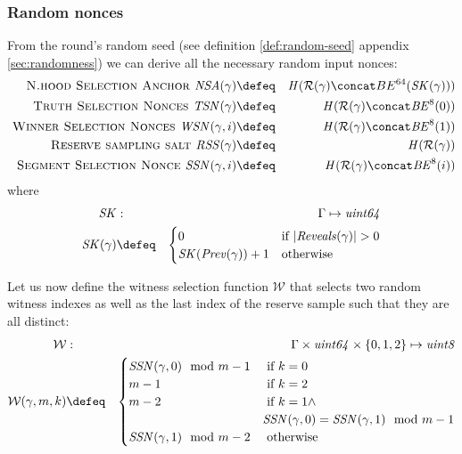 \subsubsection{Random nonces}

\begin{definition}
\label{def:nonce-round}

From the round's random seed (see definition \ref{def:random-seed} appendix \ref{sec:randomness}) we can derive all the necessary random input nonces:
%
\begin{eqnarray}
\textsc{ N.hood Selection Anchor   }\mathit{NSA}(\gamma)&\defeq&\mathit{H}(\mathcal{R}(\gamma)\concat BE^{64}(\mathit{SK}(\gamma)))\\
\textsc{ Truth Selection Nonces  }\mathit{TSN}(\gamma)&\defeq&\mathit{H}(\mathcal{R}(\gamma)\concat\mathit{BE}^{8}(0)) \\
\textsc{ Winner Selection Nonces  }\mathit{WSN}(\gamma, i)&\defeq&\mathit{H}(\mathcal{R}(\gamma)\concat\mathit{BE}^{8}(1)) \\
\textsc{ Reserve sampling salt } \mathit{RSS}(\gamma)&\defeq&\mathit{H}(\mathcal{R}(\gamma)) \\
\textsc{ Segment Selection Nonce } \mathit{SSN}(\gamma,i)&\defeq&\mathit{H}(\mathcal{R}(\gamma)\concat\mathit{BE}^{8}(i))
\end{eqnarray}
where 
\begin{eqnarray}
\mathit{SK}&:&\Gamma\mapsto\mathit{uint64}\\
\mathit{SK}(\gamma)&\defeq&\begin{cases}0&\text{if }\lvert\mathit{Reveals}(\gamma)\rvert>0\\
\mathit{SK}(\mathit{Prev}(\gamma))+1&\text{otherwise}
\end{cases}
\end{eqnarray}

Let us now define the witness selection function $\mathcal{W}$ that selects two random witness indexes as well as the last index of the reserve sample such that they are all distinct:
%
\begin{eqnarray}
\mathcal{W}&:&\Gamma\times\mathit{uint64}\times\{0,1,2\}\mapsto\mathit{uint8}\\
\mathcal{W}(\gamma,m,k)&\defeq&\begin{cases}
\mathit{SSN}(\gamma,0) \mod m-1&\text{ if }k=0\\
m-1&\text{ if }k=2\\
m-2&\text{ if }k=1 \land\\
& \mathit{SSN}(\gamma,0)=\mathit{SSN}(\gamma,1) \mod m-1\\
\mathit{SSN}(\gamma,1) \mod m-2&\text{ otherwise }
\end{cases}
\end{eqnarray}
\end{definition}

